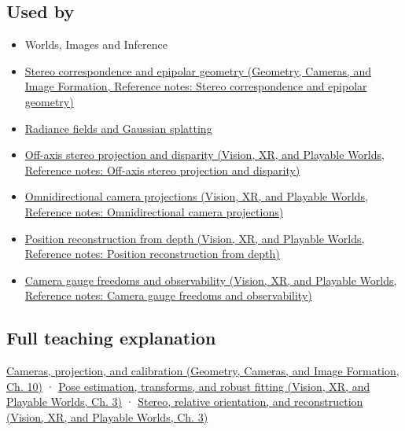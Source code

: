 \subsection{Used by}\label{appendix-3ee9861904d5-used-by}

\begin{itemize}
\item
  {Worlds, Images and Inference}
\item
  \href{../03-Geometry-Cameras-and-Image-Formation/main.pdf\#nameddest=appendix-c4e98b6e4001}{Stereo correspondence and epipolar geometry (Geometry, Cameras, and Image Formation, Reference notes: Stereo correspondence and epipolar geometry)}
\item
  \hyperref[appendix-c5b332e400e7]{Radiance fields and Gaussian splatting}
\item
  \href{../07-Vision-XR-and-Playable-Worlds/main.pdf\#nameddest=appendix-0976e86e5b9f}{Off-axis stereo projection and disparity (Vision, XR, and Playable Worlds, Reference notes: Off-axis stereo projection and disparity)}
\item
  \href{../07-Vision-XR-and-Playable-Worlds/main.pdf\#nameddest=appendix-fc99ad39f351}{Omnidirectional camera projections (Vision, XR, and Playable Worlds, Reference notes: Omnidirectional camera projections)}
\item
  \href{../07-Vision-XR-and-Playable-Worlds/main.pdf\#nameddest=appendix-2cbf2968e866}{Position reconstruction from depth (Vision, XR, and Playable Worlds, Reference notes: Position reconstruction from depth)}
\item
  \href{../07-Vision-XR-and-Playable-Worlds/main.pdf\#nameddest=appendix-113f0267e5f4}{Camera gauge freedoms and observability (Vision, XR, and Playable Worlds, Reference notes: Camera gauge freedoms and observability)}
\end{itemize}

\subsection{Full teaching explanation}\label{appendix-3ee9861904d5-full-teaching-explanation}

\href{../03-Geometry-Cameras-and-Image-Formation/main.pdf\#nameddest=03-visual-computing-i-ch003-cameras-projection-and-calibration}{Cameras, projection, and calibration (Geometry, Cameras, and Image Formation, Ch. 10)} · \href{../07-Vision-XR-and-Playable-Worlds/main.pdf\#nameddest=04-visual-computing-ii-ch032-pose-estimation-transforms-and-robust-fitting}{Pose estimation, transforms, and robust fitting (Vision, XR, and Playable Worlds, Ch. 3)} · \href{../07-Vision-XR-and-Playable-Worlds/main.pdf\#nameddest=04-visual-computing-ii-ch032-stereo-relative-orientation-and-reconstruction}{Stereo, relative orientation, and reconstruction (Vision, XR, and Playable Worlds, Ch. 3)}


